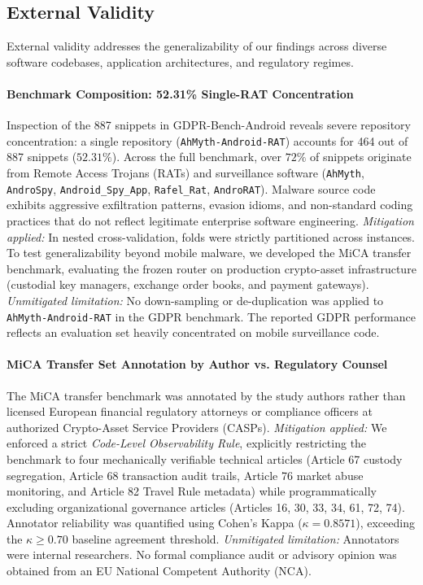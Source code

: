 \subsection{External Validity}
External validity addresses the generalizability of our findings across diverse software codebases, application architectures, and regulatory regimes.

\paragraph{Benchmark Composition: 52.31\% Single-RAT Concentration}
Inspection of the 887 snippets in GDPR-Bench-Android reveals severe repository concentration: a single repository (\texttt{AhMyth-Android-RAT}) accounts for 464 out of 887 snippets ($52.31\%$). Across the full benchmark, over $72\%$ of snippets originate from Remote Access Trojans (RATs) and surveillance software (\texttt{AhMyth}, \texttt{AndroSpy}, \texttt{Android\_Spy\_App}, \texttt{Rafel\_Rat}, \texttt{AndroRAT}). Malware source code exhibits aggressive exfiltration patterns, evasion idioms, and non-standard coding practices that do not reflect legitimate enterprise software engineering.
\textit{Mitigation applied:} In nested cross-validation, folds were strictly partitioned across instances. To test generalizability beyond mobile malware, we developed the MiCA transfer benchmark, evaluating the frozen router on production crypto-asset infrastructure (custodial key managers, exchange order books, and payment gateways).
\textit{Unmitigated limitation:} No down-sampling or de-duplication was applied to \texttt{AhMyth-Android-RAT} in the GDPR benchmark. The reported GDPR performance reflects an evaluation set heavily concentrated on mobile surveillance code.

\paragraph{MiCA Transfer Set Annotation by Author vs. Regulatory Counsel}
The MiCA transfer benchmark was annotated by the study authors rather than licensed European financial regulatory attorneys or compliance officers at authorized Crypto-Asset Service Providers (CASPs).
\textit{Mitigation applied:} We enforced a strict \textit{Code-Level Observability Rule}, explicitly restricting the benchmark to four mechanically verifiable technical articles (Article 67 custody segregation, Article 68 transaction audit trails, Article 76 market abuse monitoring, and Article 82 Travel Rule metadata) while programmatically excluding organizational governance articles (Articles 16, 30, 33, 34, 61, 72, 74). Annotator reliability was quantified using Cohen's Kappa ($\kappa = 0.8571$), exceeding the $\kappa \ge 0.70$ baseline agreement threshold.
\textit{Unmitigated limitation:} Annotators were internal researchers. No formal compliance audit or advisory opinion was obtained from an EU National Competent Authority (NCA).

